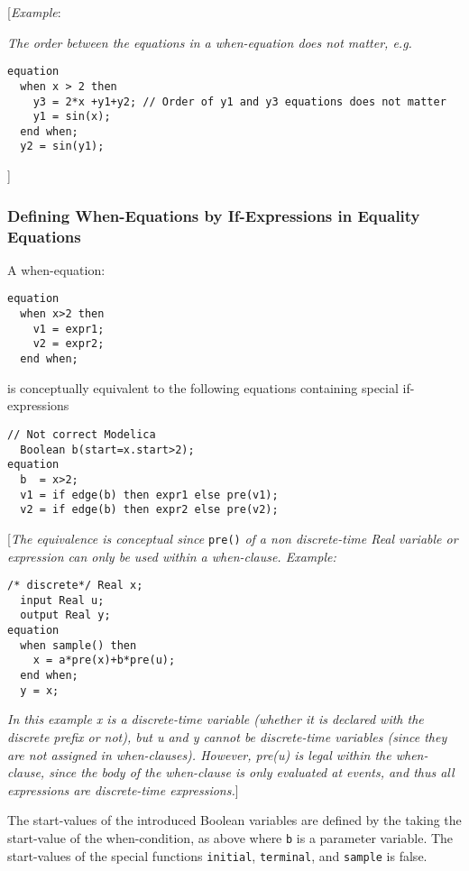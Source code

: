 {[}\emph{Example}:

\emph{The order between the equations in a when-equation does not
matter, e.g.}

\begin{lstlisting}[language=modelica]
equation
  when x > 2 then
    y3 = 2*x +y1+y2; // Order of y1 and y3 equations does not matter
    y1 = sin(x);
  end when;
  y2 = sin(y1);
\end{lstlisting}

{]}

\subsubsection{Defining When-Equations by If-Expressions in Equality Equations}

A when-equation:
\begin{lstlisting}[language=modelica]
equation
  when x>2 then
    v1 = expr1;
    v2 = expr2;
  end when;
\end{lstlisting}

is conceptually equivalent to the following equations containing special
if-expressions

\begin{lstlisting}[language=modelica]
  // Not correct Modelica
  Boolean b(start=x.start>2);
equation
  b  = x>2;
  v1 = if edge(b) then expr1 else pre(v1);
  v2 = if edge(b) then expr2 else pre(v2);
\end{lstlisting}

{[}\emph{The equivalence is conceptual since} \lstinline!pre()! \emph{of a non
discrete-time Real variable or expression can only be used within a
when-clause. Example:}

\begin{lstlisting}[language=modelica]
  /* discrete*/ Real x;
  input Real u;
  output Real y;
equation
  when sample() then
    x = a*pre(x)+b*pre(u);
  end when;
  y = x;
\end{lstlisting}

\emph{In this example x is a discrete-time variable (whether it is
declared with the discrete prefix or not), but u and y cannot be
discrete-time variables (since they are not assigned in when-clauses).
However, pre(u) is legal within the when-clause, since the body of the
when-clause is only evaluated at events, and thus all expressions are
discrete-time expressions.}{]}

The start-values of the introduced Boolean variables are defined by the
taking the start-value of the when-condition, as above where \lstinline!b! is a
parameter variable. The start-values of the special functions \lstinline!initial!,
\lstinline!terminal!, and \lstinline!sample! is false.

